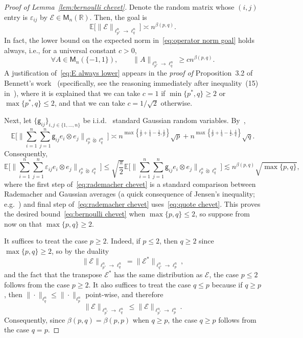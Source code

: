 \documentclass[11pt,reqno]{amsart}
\renewcommand{\le}{\leqslant}
\renewcommand{\ge}{\geqslant}
\newcommand{\n}{\{1,\ldots,n\}}
\newcommand{\e}{\varepsilon}
\newcommand{\R}{\mathbb R}
\theoremstyle{remark}
\newcommand{\M}{\mathsf{M}}
\newcommand{\E}{\mathbb{ E}}
\renewcommand{\1}{\mathbf 1}
\newcommand{\g}{\mathsf{g}}
\newcommand{\ti}{\check{\otimes}}
\begin{document}
\begin{proof}[Proof of Lemma~\ref{lem:bernoulli chevet}] Denote the random matrix whose $(i,j)$ entry is $\e_{ij}$ by $\mathscr{E}\in \M_n(\R)$. Then,  the goal is
\begin{equation}\label{eq:operator norm goal}
\E \big[\|\mathscr{E}\|_{\ell_{\!\! p^*}^n\to \ell_q^n}\big]\asymp n^{\beta(p,q)}.
\end{equation}
In fact, the lower  bound on the expected norm in~\eqref{eq:operator norm goal} holds always, i.e., for a universal constant $c>0$,
\begin{equation}\label{eq:E always lower}
\forall {A}\in \M_n(\{-1,1\}),\qquad \|{A}\|_{\ell_{\!\! p^*}^n\to \ell_q^n}\ge cn^{\beta(p,q)}.
\end{equation}
A justification of~\eqref{eq:E always lower} appears in the {\em proof of} Proposition~3.2 of Bennett's work~\cite{Ben77} (specifically, see the reasoning immediately after inequality~(15) in~\cite{Ben77}), where it is explained that we can take $c=1$ if $\min\{p^*,q\}\ge 2$ or $\max\{p^*,q\}\le 2$, and  that we can take $c=1/\sqrt{2}$ otherwise.

Next, let $\{\g_{ij}\}_{i,j\in \n}$ be i.i.d.~ standard Gaussian random variables. By~\cite[Lemme~3.1]{Che78},
\begin{equation}\label{eq:quote chevet}
\E \bigg[\Big\|\sum_{i=1}^n\sum_{j=1}^n \g_{ij} e_i\otimes e_j\Big\|_{\ell_p^n\ti \ell_q^n}\bigg]\asymp n^{\max\left\{\frac{1}{p}+\frac{1}{q}-\frac12,\frac{1}{p}\right\}}\sqrt{p} +n^{\max\left\{\frac{1}{p}+\frac{1}{q}-\frac12,\frac{1}{q}\right\}}\sqrt{q}.
\end{equation}
Consequently,
\begin{equation}\label{eq:rademacher chevet}
\E \bigg[\Big\|\sum_{i=1}^n\sum_{j=1}^n \e_{ij} e_i\otimes e_j\Big\|_{\ell_p^n\ti \ell_q^n}\bigg]\le \sqrt{\frac{\pi}{2}}\E \bigg[\Big\|\sum_{i=1}^n\sum_{j=1}^n \g_{ij} e_i\otimes e_j\Big\|_{\ell_p^n\ti \ell_q^n}\bigg]\lesssim n^{\beta(p,q)}\sqrt{\max\{p,q\}},
\end{equation}
where the first step of~\eqref{eq:rademacher chevet} is a standard comparison between Rademacher and Gaussian averages (a quick consequence of Jensen's inequality; e.g.~\cite{MP76}) and final step of~\eqref{eq:rademacher chevet}  uses~\eqref{eq:quote chevet}. This proves the desired bound~\eqref{eq:bernoulli chevet} when $\max\{p,q\}\le 2$, so suppose from now on that $\max\{p,q\}\ge 2$.


It suffices to treat the case $p\ge 2$. Indeed,  if $p\le 2$, then  $q\ge 2$ since $\max\{p,q\}\ge 2$, so by the duality $$\|\mathscr{E}\|_{\ell_{\!\! p^*}^n\to \ell_q^n}=\|\mathscr{E}^*\|_{\ell_{\!\! q^*}^n\to \ell_p^n},$$
and the fact that the transpose $\mathscr{E}^*$ has the same distribution as $\mathscr{E}$, the case $p\le 2$ follows from the case $p\ge 2$. It also suffices to treat the case $q\le  p$ because if $q\ge p$, then $\|\cdot\|_{\ell_q^n}\le \|\cdot\|_{\ell_p^n}$ point-wise, and therefore
$$
\|\mathscr{E}\|_{\ell_{\!\! p^*}^n\to \ell_q^n}\le \|\mathscr{E}\|_{\ell_{\!\! p^*}^n\to \ell_p^n}.
$$
Consequently, since $\beta(p,q)=\beta(p,p)$ when $q\ge p$, the case $q\ge p$ follows from the case $q=p$.


\end{proof}
\end{document}
